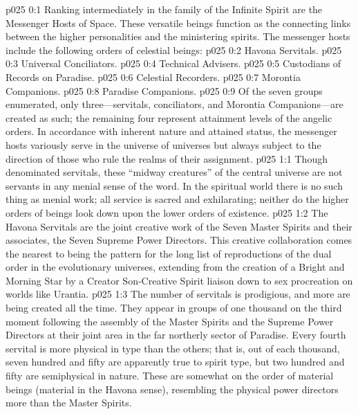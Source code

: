 \author{One High in Authority}
\vs p025 0:1 Ranking intermediately in the family of the Infinite Spirit are the Messenger Hosts of Space. These versatile beings function as the connecting links between the higher personalities and the ministering spirits. The messenger hosts include the following orders of celestial beings:
\pc \vs p025 0:2 \bibnobreakspace Havona Servitals.
\vs p025 0:3 \bibnobreakspace Universal Conciliators.
\vs p025 0:4 \bibnobreakspace Technical Advisers.
\vs p025 0:5 \bibnobreakspace Custodians of Records on Paradise.
\vs p025 0:6 \bibnobreakspace Celestial Recorders.
\vs p025 0:7 \bibnobreakspace Morontia Companions.
\vs p025 0:8 \bibnobreakspace Paradise Companions.
\pc \vs p025 0:9 Of the seven groups enumerated, only three---servitals, conciliators, and Morontia Companions---are created as such; the remaining four represent attainment levels of the angelic orders. In accordance with inherent nature and attained status, the messenger hosts variously serve in the universe of universes but always subject to the direction of those who rule the realms of their assignment.\plusone
{}
\vs p025 1:1 Though denominated servitals, these “midway creatures” of the central universe are not servants in any menial sense of the word. In the spiritual world there is no such thing as menial work; all service is sacred and exhilarating; neither do the higher orders of beings look down upon the lower orders of existence.
\pc \vs p025 1:2 The Havona Servitals are the joint creative work of the Seven Master Spirits and their associates, the Seven Supreme Power Directors. This creative collaboration comes the nearest to being the pattern for the long list of reproductions of the dual order in the evolutionary universes, extending from the creation of a Bright and Morning Star by a Creator Son\hyp{}Creative Spirit liaison down to sex procreation on worlds like Urantia.
\vs p025 1:3 The number of servitals is prodigious, and more are being created all the time. They appear in groups of one thousand on the third moment following the assembly of the Master Spirits and the Supreme Power Directors at their joint area in the far northerly sector of Paradise. Every fourth servital is more physical in type than the others; that is, out of each thousand, seven hundred and fifty are apparently true to spirit type, but two hundred and fifty are semiphysical in nature. These  are somewhat on the order of material beings (material in the Havona sense), resembling the physical power directors more than the Master Spirits.
